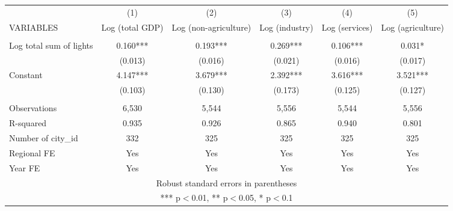 \documentclass[]{article}
\begin{document}
\begin{tabular}{lccccc} \hline
 & (1) & (2) & (3) & (4) & (5) \\
VARIABLES & Log (total GDP) & Log (non-agriculture) & Log (industry) & Log (services) & Log (agriculture) \\ \hline
 &  &  &  &  &  \\
Log total sum of lights & 0.160*** & 0.193*** & 0.269*** & 0.106*** & 0.031* \\
 & (0.013) & (0.016) & (0.021) & (0.016) & (0.017) \\
Constant & 4.147*** & 3.679*** & 2.392*** & 3.616*** & 3.521*** \\
 & (0.103) & (0.130) & (0.173) & (0.125) & (0.127) \\
 &  &  &  &  &  \\
Observations & 6,530 & 5,544 & 5,556 & 5,544 & 5,556 \\
R-squared & 0.935 & 0.926 & 0.865 & 0.940 & 0.801 \\
Number of city\_id & 332 & 325 & 325 & 325 & 325 \\
Regional FE & Yes & Yes & Yes & Yes & Yes \\
 Year FE & Yes & Yes & Yes & Yes & Yes \\ \hline
\multicolumn{6}{c}{ Robust standard errors in parentheses} \\
\multicolumn{6}{c}{ *** p$<$0.01, ** p$<$0.05, * p$<$0.1} \\
\end{tabular}
\end{document}
